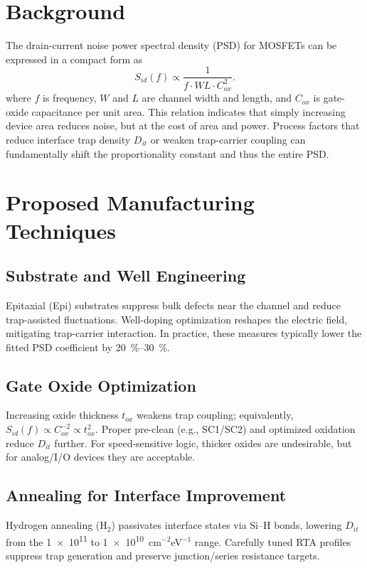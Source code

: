 \documentclass[conference]{IEEEtran}
\begin{document}
\section{Background}
The drain-current noise power spectral density (PSD) for MOSFETs can be expressed in a compact form as
\begin{equation}
S_{id}(f) \propto \frac{1}{f \cdot W L \cdot C_{ox}^{2}}.
\end{equation}
where $f$ is frequency, $W$ and $L$ are channel width and length, and $C_{ox}$ is gate-oxide capacitance per unit area. This relation indicates that simply increasing device area reduces noise, but at the cost of area and power. Process factors that reduce interface trap density $D_{it}$ or weaken trap-carrier coupling can fundamentally shift the proportionality constant and thus the entire PSD.

\section{Proposed Manufacturing Techniques}
\subsection{Substrate and Well Engineering}
Epitaxial (Epi) substrates suppress bulk defects near the channel and reduce trap-assisted fluctuations. Well-doping optimization reshapes the electric field, mitigating trap-carrier interaction. In practice, these measures typically lower the fitted PSD coefficient by \SI{20}{\percent}--\SI{30}{\percent}.

\subsection{Gate Oxide Optimization}
Increasing oxide thickness $t_{ox}$ weakens trap coupling; equivalently, $S_{id}(f)\propto C_{ox}^{-2}\propto t_{ox}^{2}$. Proper pre-clean (e.g., SC1/SC2) and optimized oxidation reduce $D_{it}$ further. For speed-sensitive logic, thicker oxides are undesirable, but for analog/I/O devices they are acceptable.

\subsection{Annealing for Interface Improvement}
Hydrogen annealing (H$_2$) passivates interface states via Si--H bonds, lowering $D_{it}$ from the \num{1e11} to \num{1e10}~cm$^{-2}$eV$^{-1}$ range. Carefully tuned RTA profiles suppress trap generation and preserve junction/series resistance targets.
\end{document}
